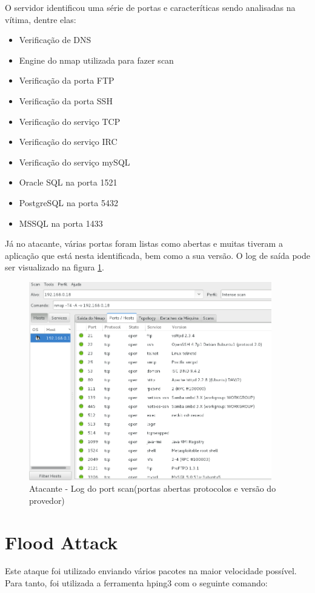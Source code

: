 	O servidor identificou uma série de portas e caracteríticas sendo analisadas na
	vítima, dentre elas:

	\begin{itemize}
		\item Verificação de DNS
		\item Engine do nmap utilizada para fazer scan
		\item Verificação da porta FTP
		\item Verificação da porta SSH
		\item Verificação do serviço TCP
		\item Verificação do serviço IRC
		\item Verificação do serviço mySQL
		\item Oracle SQL na porta 1521
		\item PostgreSQL na porta 5432
		\item MSSQL na porta 1433
	\end{itemize}

	Já no atacante, várias portas foram listas como abertas e muitas tiveram a aplicação
	que está nesta identificada, bem como a sua versão. O log de saída pode ser visualizado
	na figura \ref{fig:atacante_log_port_scan}.

	 \begin{figure}[h]
 	 \centering
 	 \includegraphics[width=400px, scale=1]{resource/atacante_log_port_scan}
 	 \caption{Atacante - Log do port scan(portas abertas protocolos e versão do provedor)}
  \label{fig:atacante_log_port_scan}
  \end{figure}

	\section{Flood Attack}
	\label{sec:Flood_Attack}
	Este ataque foi utilizado enviando vários pacotes na maior velocidade possível.
	Para tanto, foi utilizada a ferramenta hping3 com o seguinte comando:

